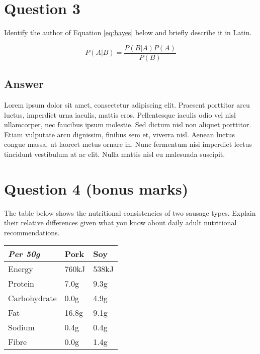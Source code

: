 \documentclass[
	12pt, %
]{../Template/fphw}
\begin{document}

\section*{Question 3}

\begin{problem}
	Identify the author of Equation \ref{eq:bayes} below and briefly describe it in Latin.
	
	\medskip
	
	\begin{equation}\label{eq:bayes}
		P(A|B) = \frac{P(B|A)P(A)}{P(B)}
	\end{equation}
	
	\smallskip
\end{problem}


\subsection*{Answer} 

Lorem ipsum dolor sit amet, consectetur adipiscing elit. Praesent porttitor arcu luctus, imperdiet urna iaculis, mattis eros. Pellentesque iaculis odio vel nisl ullamcorper, nec faucibus ipsum molestie. Sed dictum nisl non aliquet porttitor. Etiam vulputate arcu dignissim, finibus sem et, viverra nisl. Aenean luctus congue massa, ut laoreet metus ornare in. Nunc fermentum nisi imperdiet lectus tincidunt vestibulum at ac elit. Nulla mattis nisl eu malesuada suscipit.


\section*{Question 4 (bonus marks)}

\begin{problem}
	The table below shows the nutritional consistencies of two sausage types. Explain their relative differences given what you know about daily adult nutritional recommendations.
	
	\bigskip
    
	\begin{center}
		\begin{tabular}{l l l}
			\toprule
			\textit{Per 50g} & Pork & Soy \\
			\midrule
			Energy & 760kJ & 538kJ\\
			Protein & 7.0g & 9.3g\\
			Carbohydrate & 0.0g & 4.9g\\
			Fat & 16.8g & 9.1g\\
			Sodium & 0.4g & 0.4g\\
			Fibre & 0.0g & 1.4g\\
			\bottomrule
		\end{tabular}
	\end{center}
	
	\medskip
\end{problem}
\end{document}
